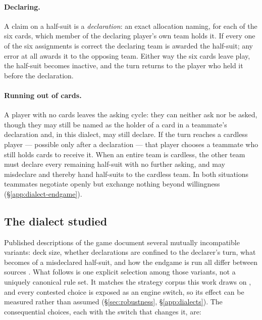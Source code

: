\documentclass[11pt]{article}
\theoremstyle{definition}
\begin{document}
\paragraph{Declaring.} A claim on a half-suit is a \emph{declaration}: an exact
allocation naming, for each of the six cards, which member of the declaring
player's own team holds it. If every one of the six assignments is correct the
declaring team is awarded the half-suit; any error at all awards it to the
opposing team. Either way the six cards leave play, the half-suit becomes
inactive, and the turn returns to the player who held it before the
declaration.

\paragraph{Running out of cards.} A player with no cards leaves the asking
cycle: they can neither ask nor be asked, though they may still be named as the
holder of a card in a teammate's declaration and, in this dialect, may still
declare. If the turn reaches a cardless player --- possible only after a
declaration --- that player chooses a teammate who still holds cards to receive
it. When an entire team is cardless, the other team must declare every remaining
half-suit with no further asking, and may misdeclare and thereby hand half-suits
to the cardless team. In both situations teammates negotiate openly but exchange
nothing beyond willingness (\S\ref{app:dialect-endgame}).

\subsection{The dialect studied}
\label{sec:rules-dialect}

Published descriptions of the game document several mutually incompatible
variants: deck size, whether declarations are confined to the declarer's turn,
what becomes of a misdeclared half-suit, and how the endgame is run all differ
between sources \cite{pagat}. What follows is one explicit selection among those
variants, not a uniquely canonical rule set. It matches the strategy corpus this
work draws on \cite{develin}, and every contested choice is exposed as an engine
switch, so its effect can be measured rather than assumed
(\S\ref{sec:robustness}, \S\ref{app:dialects}). The consequential choices, each
with the switch that changes it, are:
\end{document}
